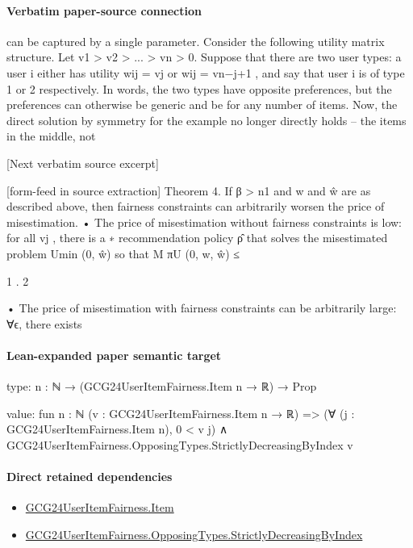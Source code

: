 \documentclass[10pt]{article}
\begin{document}
\paragraph{Verbatim paper-source connection}
\begin{ReviewVerbatim}
can be captured by a single parameter. Consider the following utility matrix structure. Let v1 >
v2 > ... > vn > 0. Suppose that there are two user types: a user i either has utility wij = vj or
wij = vn−j+1 , and say that user i is of type 1 or 2 respectively. In words, the two types have opposite
preferences, but the preferences can otherwise be generic and be for any number of items. Now, the
direct solution by symmetry for the example no longer directly holds – the items in the middle, not

[Next verbatim source excerpt]


[form-feed in source extraction]
Theorem 4. If β > n1 and w and ŵ are as described above, then fairness constraints can arbitrarily
worsen the price of misestimation.
• The price of misestimation without fairness constraints is low: for all {vj }, there is a
∗
recommendation policy ρ̂ that solves the misestimated problem Umin
(0, ŵ) so that
M
πU
(0, w, ŵ) ≤

1
.
2

• The price of misestimation with fairness constraints can be arbitrarily large: ∀ϵ, there exists
\end{ReviewVerbatim}



\paragraph{Lean-expanded paper semantic target}
\begin{ReviewVerbatim}
type:
{n : ℕ} → (GCG24UserItemFairness.Item n → ℝ) → Prop

value:
fun {n : ℕ} (v : GCG24UserItemFairness.Item n → ℝ) =>
  (∀ (j : GCG24UserItemFairness.Item n), 0 < v j) ∧ GCG24UserItemFairness.OpposingTypes.StrictlyDecreasingByIndex v
\end{ReviewVerbatim}

\paragraph{Direct retained dependencies}
\begin{itemize}\raggedright
\item \hyperlink{governing-declaration-a7c560a429c6e204}{GCG24\allowbreak{}User\allowbreak{}Item\allowbreak{}Fairness.\allowbreak{}Item}
\item \hyperlink{governing-declaration-8278344d2ddef9a8}{GCG24\allowbreak{}User\allowbreak{}Item\allowbreak{}Fairness.\allowbreak{}Opposing\allowbreak{}Types.\allowbreak{}Strictly\allowbreak{}Decreasing\allowbreak{}By\allowbreak{}Index}
\end{itemize}
\end{document}
